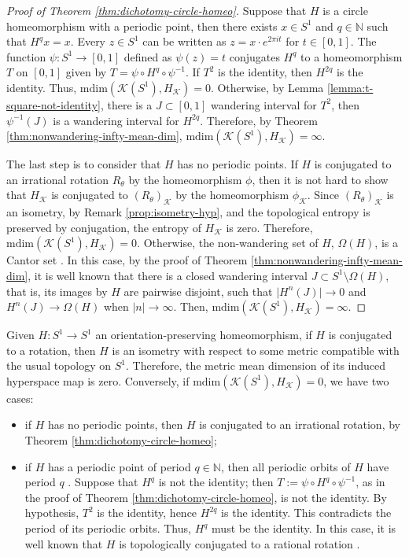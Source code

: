 \documentclass[sn-mathphys-num]{sn-jnl}%
\theoremstyle{thmstyleone}%
\theoremstyle{thmstyletwo}%
\theoremstyle{thmstylethree}%
\newcommand{\abs}[1]{\lvert#1\rvert}
\newcommand*\induce[1]{#1_\mathcal{K}}
\newcommand*\hyp[1]{\mathcal{#1}}
\begin{document}
\begin{proof}[Proof of Theorem \emph{\ref{thm:dichotomy-circle-homeo}}]
    Suppose that $H$ is a circle homeomorphism with a periodic point, then there exists $x \in S^1$ and $q \in \mathbb{N}$ such that $H^qx = x$. Every $z \in S^1$ can be written as $z = x\cdot e^{2\pi it}$ for $t \in [0, 1]$. The function $\psi: S^1 \to [0, 1]$ defined as $\psi(z) = t$ conjugates $H^q$ to a homeomorphism $T$ on $[0, 1]$ given by $T = \psi\circ H^q\circ \psi^{-1}$. If $T^2$ is the identity, then $H^{2q}$ is the identity. Thus, $\text{mdim}(\hyp{K}(S^1), \induce{H}) = 0$. Otherwise, by Lemma \ref{lemma:t-square-not-identity}, there is a $J \subset [0, 1]$ wandering interval for $T^2$, then $\psi^{-1}(J)$ is a wandering interval for $H^{2q}$. Therefore, by Theorem \ref{thm:nonwandering-infty-mean-dim}, $\text{mdim}(\hyp{K}(S^1), \induce{H}) = \infty$. 

    The last step is to consider that $H$ has no periodic points. If $H$ is conjugated to an irrational rotation $R_\theta$ by the homeomorphism $\phi$, then it is not hard to show that $\induce{H}$ is conjugated to $\induce{(R_\theta)}$ by the homeomorphism $\induce{\phi}$. Since $\induce{(R_\theta)}$ is an isometry, by Remark \ref{prop:isometry-hyp}, and the topological entropy is preserved by conjugation, the entropy of $\induce{H}$ is zero. Therefore, $\text{mdim}(\hyp{K}(S^1), \induce{H}) = 0$. Otherwise, the non-wandering set of $H$, $\Omega(H)$, is a Cantor set \cite[Proposition 2.5]{defaria_guarino_2022}. In this case, by the proof of Theorem \ref{thm:nonwandering-infty-mean-dim}, it is well known that there is a closed wandering interval $J \subset S^1\setminus \Omega(H)$, that is, its images by $H$ are pairwise disjoint, such that $\abs{H^n(J)} \to 0$ and $H^n(J) \to \Omega(H)$ when $\abs{n} \to \infty$. Then, $\text{mdim}(\hyp{K}(S^1), \induce{H}) = \infty$.
\end{proof}

Given $H: S^1 \to S^1$ an orientation-preserving homeomorphism, if $H$ is conjugated to a rotation, then $H$ is an isometry with respect to some metric compatible with the usual topology on $S^1$. Therefore, the metric mean dimension of its induced hyperspace map is zero. Conversely, if $\text{mdim}(\hyp{K}(S^1), \induce{H}) = 0$, we have two cases:
\begin{itemize}
    \item if $H$ has no periodic points, then $H$ is conjugated to an irrational rotation, by Theorem \ref{thm:dichotomy-circle-homeo};
    \item if $H$ has a periodic point of period $q \in \mathbb{N}$, then all periodic orbits of $H$ have period $q$ \cite[Proposition 2.4]{defaria_guarino_2022}. Suppose that $H^q$ is not the identity; then $T := 
    \psi\circ H^q\circ \psi^{-1}$, as in the proof of Theorem \ref{thm:dichotomy-circle-homeo}, is not the identity. By hypothesis, $T^2$ is the identity, hence $H^{2q}$ is the identity. This contradicts the period of its periodic orbits. Thus, $H^q$ must be the identity. In this case, it is well known that $H$ is topologically conjugated to a rational rotation \cite{constantin_kolev_1994}.
\end{itemize}
\end{document}

